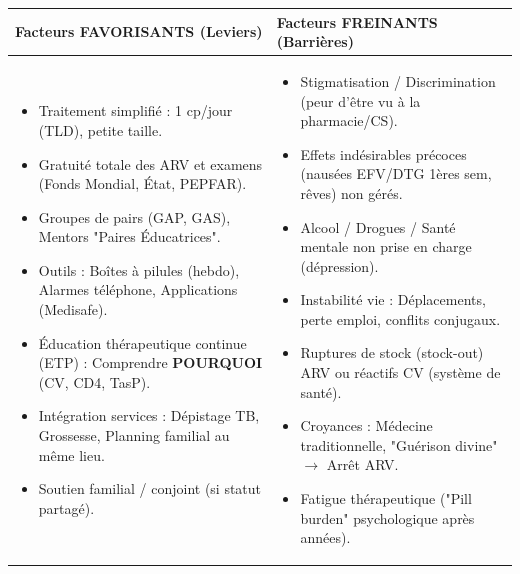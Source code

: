 \documentclass[11pt]{article}
\begin{document}
\begin{aretenir}
\begin{center}
\begin{tabularx}{\linewidth}{|X|X|}\hline
\cellcolor{popgreenL} \textbf{Facteurs FAVORISANTS (Leviers)} & \cellcolor{poporangeL} \textbf{Facteurs FREINANTS (Barrières)} \\ \hline
\begin{itemize}\item Traitement simplifié : 1 cp/jour (TLD), petite taille.
\item Gratuité totale des ARV et examens (Fonds Mondial, État, PEPFAR).
\item Groupes de pairs (GAP, GAS), Mentors "Paires Éducatrices".
\item Outils : Boîtes à pilules (hebdo), Alarmes téléphone, Applications (Medisafe).
\item Éducation thérapeutique continue (ETP) : Comprendre \textbf{POURQUOI} (CV, CD4, TasP).
\item Intégration services : Dépistage TB, Grossesse, Planning familial au même lieu.
\item Soutien familial / conjoint (si statut partagé).
\end{itemize} & 
\begin{itemize}\item Stigmatisation / Discrimination (peur d'être vu à la pharmacie/CS).
\item Effets indésirables précoces (nausées EFV/DTG 1ères sem, rêves) non gérés.
\item Alcool / Drogues / Santé mentale non prise en charge (dépression).
\item Instabilité vie : Déplacements, perte emploi, conflits conjugaux.
\item Ruptures de stock (stock-out) ARV ou réactifs CV (système de santé).
\item Croyances : Médecine traditionnelle, "Guérison divine" $\to$ Arrêt ARV.
\item Fatigue thérapeutique ("Pill burden" psychologique après années).
\end{itemize} \\ \hline
\end{tabularx}
\end{center}
\end{aretenir}
\end{document}

